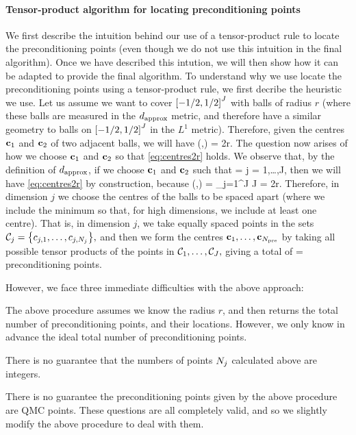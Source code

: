 \paragraph{Tensor-product algorithm for locating preconditioning points} We first describe the intuition behind our use of a tensor-product rule to locate the preconditioning points (even though we do not use this intuition in the final algorithm). Once we have described this intution, we will then show how it can be adapted to provide the final algorithm. To understand why we use locate the preconditioning points using a tensor-product rule, we first decribe the heuristic we use. Let us assume we want to cover $\cube{J}$ with balls of radius $r$ (where these balls are measured in the $d_{\mathrm{approx}}$ metric, and therefore have a similar geometry to balls on $\cube{J}$ in the $L^1$ metric). Therefore, given the centres $\mathbf{c}_{1}$ and $\mathbf{c}_{2}$ of two adjacent balls, we will have
\beq\label{eq:centres2r}
\dapprox(\bcone,\bct) = 2r.
\eeq
The question now arises of how we choose $\mathbf{c}_{1}$ and $\mathbf{c}_{2}$ so that \cref{eq:centres2r} holds. We observe that, by the definition of $d_{\mathrm{approx}}$, if we choose $\mathbf{c}_{1}$ and $\mathbf{c}_{2}$ such that
\beqs
\sqrt{\lambdaj} =  \tforall j = 1,\ldots,J,
\eeqs
then we will have \cref{eq:centres2r} by construction, because
\beqs
\dapprox(\bcone,\bct) = \sum_{j=1}^J J = 2r.
\eeqs
Therefore, in dimension $j$ we choose the centres of the balls to be spaced
\beqs
\min{}
\eeqs
apart (where we include the minimum so that, for high dimensions, we include at least one centre). That is, in dimension $j$, we take
\beq\label{eq:Nj}
\Nj \de \max{}
\eeq
equally spaced points in the sets $\centresj = \set{c_{j,1},\ldots,c_{j,\Nj}},$ and then we form the centres $\mathbf{c}_{1},\ldots,\mathbf{c}_{N_{\mathrm{pre}}}$ by taking all possible tensor products of the points in $\mathcal C_{1},\ldots,\mathcal C_{J},$ giving a total of
\beq\label{eq:Npre}
\Npre = \No \times \cdots \times \NJ
\eeq
preconditioning points.

However, we face three immediate difficulties with  the above approach:
\ben
\item The above procedure assumes we know the radius $r$, and then returns the total number of preconditioning points, and their locations. However, we only know in advance the ideal total number of preconditioning points.
\item There is no guarantee that the numbers of points $N_{j}$ calculated above are integers.
  \item There is no guarantee the preconditioning points given by the above procedure are QMC points.
    \een
    These questions are all completely valid, and so we slightly modify the above procedure to deal with them.

